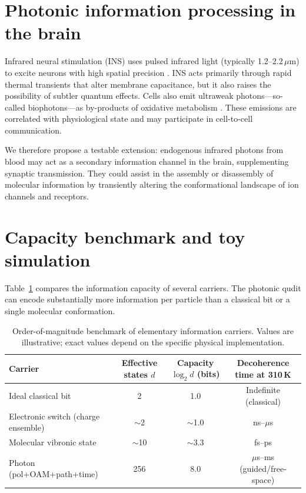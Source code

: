 \documentclass[11pt,a4paper]{article}
\begin{document}
\section*{Photonic information processing in the brain}

Infrared neural stimulation (INS) uses pulsed infrared light (typically 1.2--2.2\,$\mu$m) to excite neurons with high spatial precision \cite{wells2005,cayce2011}. INS acts primarily through rapid thermal transients that alter membrane capacitance, but it also raises the possibility of subtler quantum effects. Cells also emit ultraweak photons---so-called biophotons---as by-products of oxidative metabolism \cite{pospisil2014}. These emissions are correlated with physiological state and may participate in cell-to-cell communication.

We therefore propose a testable extension: endogenous infrared photons from blood may act as a secondary information channel in the brain, supplementing synaptic transmission. They could assist in the assembly or disassembly of molecular information by transiently altering the conformational landscape of ion channels and receptors.

\section*{Capacity benchmark and toy simulation}

Table~\ref{tab:capacity} compares the information capacity of several carriers. The photonic qudit can encode substantially more information per particle than a classical bit or a single molecular conformation.

\begin{table}[H]
\centering
\caption{Order-of-magnitude benchmark of elementary information carriers. Values are illustrative; exact values depend on the specific physical implementation.}
\label{tab:capacity}
\begin{tabular}{@{}lccc@{}}
\toprule
Carrier & Effective states $d$ & Capacity $\log_2 d$ (bits) & Decoherence time at 310\,K \\
\midrule
Ideal classical bit & 2 & 1.0 & Indefinite (classical) \\
Electronic switch (charge ensemble) & $\sim$2 & $\sim$1.0 & ns--$\mu$s \\
Molecular vibronic state & $\sim$10 & $\sim$3.3 & fs--ps \\
Photon (pol+OAM+path+time) & 256 & 8.0 & $\mu$s--ms (guided/free-space) \\
\bottomrule
\end{tabular}
\end{table}
\end{document}
